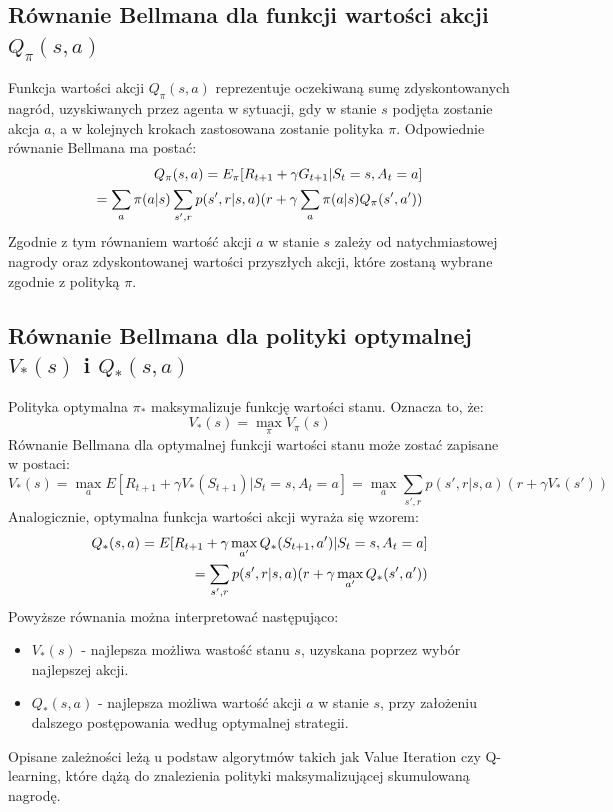 \documentclass[a4paper, 12pt]{article}
\numberwithin{equation}{section}
\begin{document}
    \subsection{Równanie Bellmana dla funkcji wartości akcji \( Q_\pi(s,a) \)}
    Funkcja wartości akcji \( Q_\pi(s,a) \) reprezentuje oczekiwaną sumę zdyskontowanych nagród, uzyskiwanych przez agenta w sytuacji, gdy w stanie \( s \) podjęta zostanie akcja \( a \), a w kolejnych krokach zastosowana zostanie polityka \( \pi \). Odpowiednie równanie Bellmana ma postać:
    \begin{align}
    Q_\pi(s,a) = E_\pi[R_{t+1} + \gamma G_{t+1}|S_t = s, A_t = a] \notag
    \\= \sum_{a} \pi(a|s) \sum_{s',r} p(s',r|s,a)(r + \gamma \sum_{a} \pi(a|s)Q_\pi(s',a'))
    \end{align}
    Zgodnie z tym równaniem wartość akcji \( a \) w stanie \( s \) zależy od natychmiastowej nagrody oraz zdyskontowanej wartości przyszłych akcji, które zostaną wybrane zgodnie z polityką \( \pi \).
    \subsection{Równanie Bellmana dla polityki optymalnej \( V_*(s) \) i \( Q_*(s,a) \)}
    Polityka optymalna \( \pi_* \) maksymalizuje funkcję wartości stanu. Oznacza to, że:
    \begin{equation}
    V_*(s) = \max_{\pi} V_{\pi}(s)
    \end{equation}
    Równanie Bellmana dla optymalnej funkcji wartości stanu może zostać zapisane w postaci:
    \begin{equation}
    V_*(s) = \max_{a} E[R_{t+1} + \gamma V_*(S_{t+1})|S_t = s, A_t = a] = 
    \max_{a} \sum_{s',r} p(s',r|s,a)(r + \gamma V_*(s'))
    \end{equation}
    Analogicznie, optymalna funkcja wartości akcji wyraża się wzorem:
    \begin{align}
    Q_*(s,a) = E[R_{t+1} + \gamma \max_{a'} Q_*(S_{t+1},a')|S_t = s, A_t = a] \notag
    \\= \sum_{s',r} p(s',r|s,a)(r + \gamma \max_{a'} Q_*(s',a'))
    \end{align}
    Powyższe równania można interpretować następująco:
    \begin{itemize}
        \item \( V_*(s) \) - najlepsza możliwa wastość stanu \( s \), uzyskana poprzez wybór najlepszej akcji.
        \item \( Q_*(s,a) \) - najlepsza możliwa wartość akcji \( a \) w stanie \( s \), przy założeniu dalszego postępowania według optymalnej strategii.
    \end{itemize}
    Opisane zależności leżą u podstaw algorytmów takich jak Value Iteration czy Q-learning, które dążą do znalezienia polityki maksymalizującej skumulowaną nagrodę.
\end{document}
